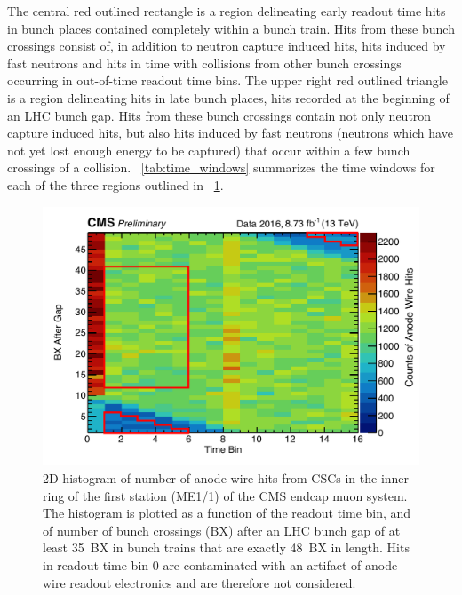 The central red outlined rectangle is a region delineating early readout time hits in bunch places contained completely within a bunch train. Hits from these bunch crossings consist of, in addition to neutron capture induced hits, hits induced by fast neutrons and hits in time with \pp collisions from other bunch crossings occurring in out-of-time readout time bins. The upper right red outlined triangle is a region delineating hits in late bunch places, \ie hits recorded at the beginning of an LHC bunch gap. Hits from these bunch crossings contain not only neutron capture induced hits, but also hits induced by fast neutrons (neutrons which have not yet lost enough energy to be captured) that occur within a few bunch crossings of a \pp collision. \Tab~\ref{tab:time_windows} summarizes the time windows for each of the three regions outlined in \FigDot~\ref{fig:rainbow}.

\begin{figure}[htbp]
	\centering
	\includegraphics[width=\dummyFigWidth]{figures/neutron/Rainbow_wire_11.pdf}
	\caption{2D histogram of number of anode wire hits from CSCs in the inner ring of the first station (ME1/1) of the CMS endcap muon system. The histogram is plotted as a function of the readout time bin, and of number of bunch crossings (BX) after an LHC bunch gap of at least 35~BX in bunch trains that are exactly 48~BX in length. Hits in readout time bin 0 are contaminated with an artifact of anode wire readout electronics and are therefore not considered.}
	\label{fig:rainbow}
\end{figure}

